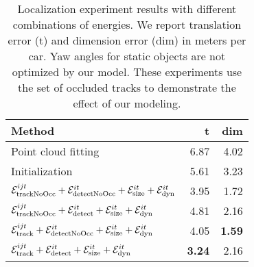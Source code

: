 

\begin{table}
  \begin{tabular}{lrr}
    \toprule
    Method & t & dim \\
    \midrule
    Point cloud fitting
    & 6.87 & 4.02\\
    Initialization
    & 5.61 & 3.23\\
    $\mathcal{E}^{ijt}_{\text{trackNoOcc}} + \mathcal{E}^{it}_{\text{detectNoOcc}} +\mathcal{E}^{it}_{\text{size}}+\mathcal{E}^{it}_{\text{dyn}}$ 
    & 3.95  & 1.72\\        
    $\mathcal{E}^{ijt}_{\text{trackNoOcc}} + \mathcal{E}^{it}_{\text{detect}} +\mathcal{E}^{it}_{\text{size}}+\mathcal{E}^{it}_{\text{dyn}}$        
    & 4.81  & 2.16\\        
    $\mathcal{E}^{ijt}_{\text{track}} + \mathcal{E}^{it}_{\text{detectNoOcc}} +\mathcal{E}^{it}_{\text{size}}+\mathcal{E}^{it}_{\text{dyn}}$      
    & 4.05  & {\bf 1.59}\\        
    $\mathcal{E}^{ijt}_{\text{track}} + \mathcal{E}^{it}_{\text{detect}} +\mathcal{E}^{it}_{\text{size}}+\mathcal{E}^{it}_{\text{dyn}}$             
    & {\bf 3.24}  & 2.16\\
    \bottomrule
  \end{tabular}
  \caption{\small Localization experiment results with different combinations of energies. We report translation error (t) and dimension error (dim) in meters per car. Yaw angles for static objects are not optimized by our model. These experiments use the set of occluded tracks to demonstrate the effect of our modeling.}
  \label{tab:localizationExperiment}
\end{table}


